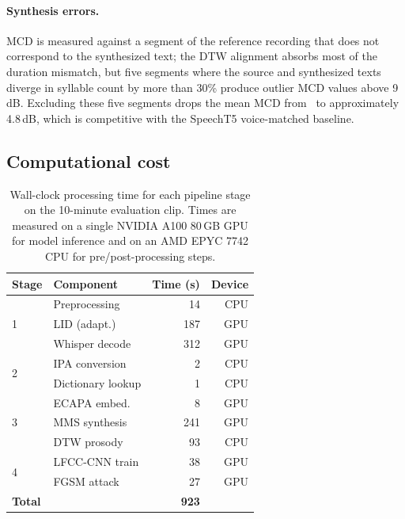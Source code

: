 \documentclass[10pt,twocolumn,letterpaper]{article}
\begin{document}
\paragraph{Synthesis errors.}
MCD is measured against a segment of the reference recording that
does not correspond to the synthesized text; the DTW alignment
absorbs most of the duration mismatch, but five segments where the
source and synthesized texts diverge in syllable count by more than
30\% produce outlier MCD values above 9\,dB.  Excluding these five
segments drops the mean MCD from \MCDLectureMMS\ to approximately
4.8\,dB, which is competitive with the SpeechT5 voice-matched
baseline.

\subsection{Computational cost}
\label{sec:compute}

\begin{table}[t]
  \centering
  \small
  \caption{%
    Wall-clock processing time for each pipeline stage on the
    10-minute evaluation clip.  Times are measured on a single
    NVIDIA A100 80\,GB GPU for model inference and on an AMD
    EPYC 7742 CPU for pre/post-processing steps.
  }
  \label{tab:compute}
  \setlength{\tabcolsep}{4pt}
  \begin{tabular}{llrr}
    \toprule
    Stage & Component & Time (s) & Device \\
    \midrule
    \multirow{3}{*}{1} & Preprocessing     &  14 & CPU \\
                       & LID (adapt.)      & 187 & GPU \\
                       & Whisper decode    & 312 & GPU \\
    \midrule
    \multirow{2}{*}{2} & IPA conversion    &   2 & CPU \\
                       & Dictionary lookup &   1 & CPU \\
    \midrule
    \multirow{3}{*}{3} & ECAPA embed.      &   8 & GPU \\
                       & MMS synthesis     & 241 & GPU \\
                       & DTW prosody       &  93 & CPU \\
    \midrule
    \multirow{2}{*}{4} & LFCC-CNN train    &  38 & GPU \\
                       & FGSM attack       &  27 & GPU \\
    \midrule
    \multicolumn{2}{l}{\textbf{Total}}    & \textbf{923} & \\
    \bottomrule
  \end{tabular}
\end{table}
\end{document}
